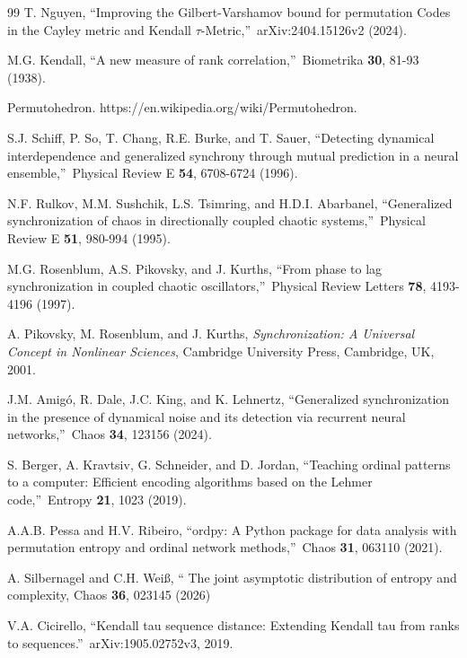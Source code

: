 \documentclass[%
 aip,
 amsmath,amssymb,
 reprint,%
]{revtex4-1}
\begin{document}
\begin{thebibliography}{99}
 T. Nguyen, \textquotedblleft Improving the
Gilbert-Varshamov bound for permutation Codes in the Cayley metric and
Kendall $\tau $-Metric,\textquotedblright\ arXiv:2404.15126v2 (2024).

 M.G. Kendall, \textquotedblleft A new measure of rank
correlation,\textquotedblright\ Biometrika \textbf{30}, 81-93 (1938).

 Permutohedron.
https://en.wikipedia.org/wiki/Permutohedron.

 S.J. Schiff, P. So, T. Chang, R.E. Burke, and T. Sauer,
\textquotedblleft Detecting dynamical interdependence and generalized
synchrony through mutual prediction in a neural ensemble,\textquotedblright\
Physical Review E \textbf{54}, 6708-6724 (1996).

 N.F. Rulkov, M.M. Sushchik, L.S. Tsimring, and H.D.I.
Abarbanel, \textquotedblleft Generalized synchronization of chaos in
directionally coupled chaotic systems,\textquotedblright\ Physical Review E 
\textbf{51}, 980-994 (1995).

 M.G. Rosenblum, A.S. Pikovsky, and J. Kurths,
\textquotedblleft From phase to lag synchronization in coupled chaotic
oscillators,\textquotedblright\ Physical Review Letters \textbf{78},
4193-4196 (1997).

 A. Pikovsky, M. Rosenblum, and J. Kurths, \textit{%
Synchronization: A Universal Concept in Nonlinear Sciences}, Cambridge
University Press, Cambridge, UK, 2001.

 J.M. Amig\'{o}, R. Dale, J.C. King, and K. Lehnertz,
\textquotedblleft Generalized synchronization in the presence of dynamical
noise and its detection via recurrent neural networks,\textquotedblright\
Chaos \textbf{34}, 123156 (2024).

 S. Berger, A. Kravtsiv, G. Schneider, and D. Jordan,
\textquotedblleft Teaching ordinal patterns to a computer: Efficient
encoding algorithms based on the Lehmer code,\textquotedblright\ Entropy 
\textbf{21}, 1023 (2019). %

 A.A.B. Pessa and H.V. Ribeiro, \textquotedblleft ordpy:
A Python package for data analysis with permutation entropy and ordinal
network methods,\textquotedblright\ Chaos \textbf{31}, 063110 (2021).

 A. Silbernagel and C.H. Wei\ss , \textquotedblleft
The joint asymptotic distribution of entropy and
complexity, Chaos \textbf{36}, 023145 (2026)

 V.A. Cicirello, \textquotedblleft Kendall tau
sequence distance: Extending Kendall tau from ranks to
sequences.\textquotedblright\ arXiv:1905.02752v3, 2019.

\end{thebibliography}
\end{document}
